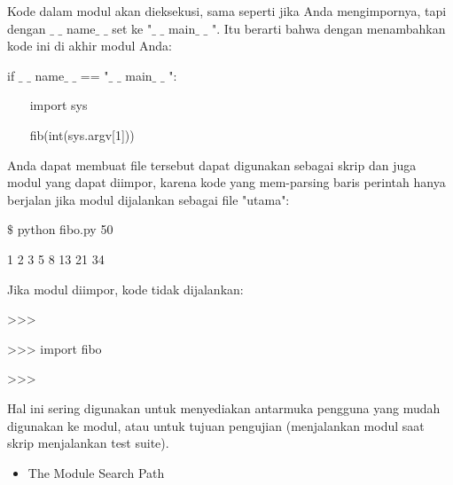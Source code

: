 \vspace{\baselineskip}
\noindent Kode dalam modul akan dieksekusi, sama seperti jika Anda mengimpornya, tapi dengan $ \_ $ $ \_ $ name$ \_ $ $ \_ $  set ke "$ \_ $ $ \_ $ main$ \_ $ $ \_ $ ". Itu berarti bahwa dengan menambahkan kode ini di akhir modul Anda:\par

\vspace{\baselineskip}
\noindent if $ \_ $ $ \_ $ name$ \_ $ $ \_ $  == "$ \_ $ $ \_ $ main$ \_ $ $ \_ $ ":\par
\vspace{\baselineskip}
\noindent ~~~ import sys\par
\vspace{\baselineskip}
\noindent ~~~ fib(int(sys.argv[1]))\par

\vspace{\baselineskip}
\noindent Anda dapat membuat file tersebut dapat digunakan sebagai skrip dan juga modul yang dapat diimpor, karena kode yang mem-parsing baris perintah hanya berjalan jika modul dijalankan sebagai file "utama":\par


\vspace{\baselineskip}
\noindent $\$$  python fibo.py 50\par


 1 2 3 5 8 13 21 34\par

\vspace{\baselineskip}
\noindent Jika modul diimpor, kode tidak dijalankan:\par


\noindent >>>\par


\noindent >>> import fibo\par


\noindent >>>\par

\vspace{\baselineskip}
\noindent Hal ini sering digunakan untuk menyediakan antarmuka pengguna yang mudah digunakan ke modul, atau untuk tujuan pengujian (menjalankan modul saat skrip menjalankan test suite).\par


\vspace{\baselineskip}
\begin{itemize}
	\item The Module Search Path
\end{itemize}

